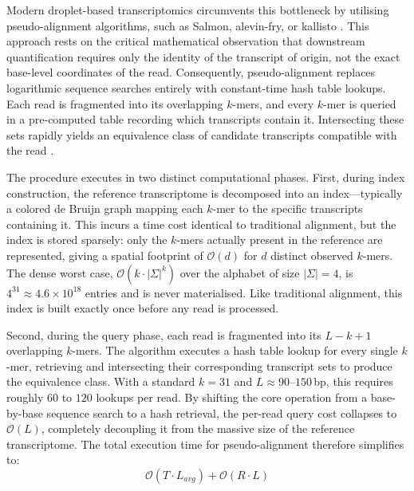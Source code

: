 Modern droplet-based transcriptomics circumvents this bottleneck by utilising pseudo-alignment algorithms, such as Salmon, alevin-fry, or kallisto \cite{patro2017salmon, bray2016near, he2022alevin}. This approach rests on the critical mathematical observation that downstream quantification requires only the identity of the transcript of origin, not the exact base-level coordinates of the read. Consequently, pseudo-alignment replaces logarithmic sequence searches entirely with constant-time hash table lookups. Each read is fragmented into its overlapping $k$-mers, and every $k$-mer is queried in a pre-computed table recording which transcripts contain it. Intersecting these sets rapidly yields an equivalence class of candidate transcripts compatible with the read \cite{he2022alevin}.

The procedure executes in two distinct computational phases. First, during index construction, the reference transcriptome is decomposed into an index---typically a colored de Bruijn graph mapping each $k$-mer to the specific transcripts containing it. This incurs a time cost identical to traditional alignment, but the index is stored sparsely: only the $k$-mers actually present in the reference are represented, giving a spatial footprint of $\mathcal{O}(d)$ for $d$ distinct observed $k$-mers. The dense worst case, $\mathcal{O}(k \cdot |\Sigma|^k)$ over the alphabet of size $|\Sigma| = 4$, is $4^{31} \approx 4.6 \times 10^{18}$ entries and is never materialised. Like traditional alignment, this index is built exactly once before any read is processed.

Second, during the query phase, each read is fragmented into its $L - k + 1$ overlapping $k$-mers. The algorithm executes a hash table lookup for every single $k$-mer, retrieving and intersecting their corresponding transcript sets to produce the equivalence class. With a standard $k = 31$ and $L \approx 90\text{--}150$\,bp, this requires roughly $60$ to $120$ lookups per read. By shifting the core operation from a base-by-base sequence search to a hash retrieval, the per-read query cost collapses to $\mathcal{O}(L)$, completely decoupling it from the massive size of the reference transcriptome. The total execution time for pseudo-alignment therefore simplifies to:
$$ \mathcal{O}(T \cdot L_{avg}) + \mathcal{O}(R \cdot L) $$

